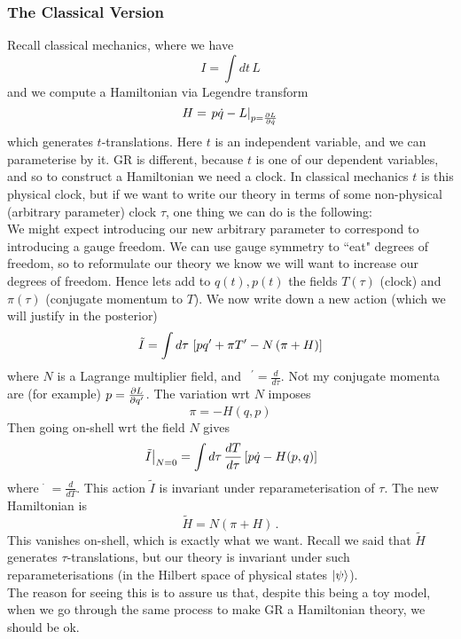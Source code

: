 \documentclass{article}
\begin{document}
\subsubsection{The Classical Version}
Recall classical mechanics, where we have 
\[
I = \int dt \, L
\]
and we compute a Hamiltonian via Legendre transform 
\[
H = \left. p\dot{q} - L \right\rvert_{p = \frac{\partial L}{\partial \dot{q}}} 
\]
which generates $t$-translations. Here $t$ is an independent variable, and we can parameterise by it. GR is different, because $t$ is one of our dependent variables, and so to construct a Hamiltonian we need a clock. In classical mechanics $t$ is this physical clock, but if we want to write our theory in terms of some non-physical (arbitrary parameter) clock $\tau$, one thing we can do is the following: \\
We might expect introducing our new arbitrary parameter to correspond to introducing a gauge freedom. We can use gauge symmetry to ``eat" degrees of freedom, so to reformulate our theory we know we will want to increase our degrees of freedom. Hence lets add to $q(t), p(t)$ the fields $T(\tau)$ (clock) and $\pi(\tau)$ (conjugate momentum to $T$). We now write down a new action (which we will justify in the posterior)
\[
\tilde{I} = \int d\tau \, \left[ pq^\prime + \pi T^\prime -N\left(  \pi  + H \right) \right]
\]
where $N$ is a Lagrange multiplier field, and $\phantom{q}^\prime = \frac{d}{d\tau}$. Not my conjugate momenta are (for example) $p = \frac{\partial L}{\partial q^\prime}$. The variation wrt $N$ imposes 
\[
\pi = -H(q,p)
\]
Then going on-shell wrt the field $N$ gives 
\[
\left. \tilde{I} \right\rvert_{N=0} = \int d\tau \, \frac{dT}{d\tau} \left[ p \dot{q} - H(p,q) \right]
\]
where $\dot{\phantom{q}} = \frac{d}{dT}$. This action $\tilde{I}$ is invariant under reparameterisation of $\tau$. The new Hamiltonian is 
\[
\tilde{H} = N(\pi + H) \, .
\]
This vanishes on-shell, which is exactly what we want. Recall we said that $\tilde{H}$ generates $\tau$-translations, but our theory is invariant under such reparameterisations (in the Hilbert space of physical states $\ket{\psi}$). \\
The reason for seeing this is to assure us that, despite this being a toy model, when we go through the same process to make GR a Hamiltonian theory, we should be ok. 
\end{document}
